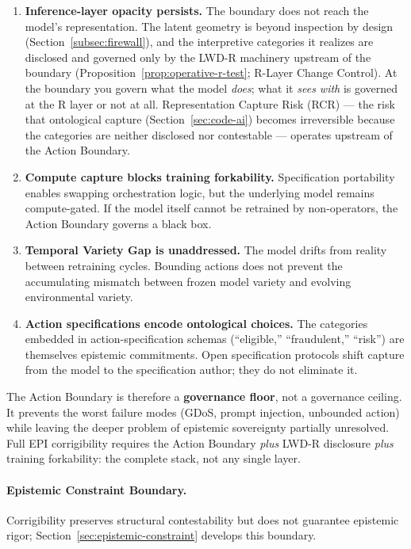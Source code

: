 \documentclass{article}
\theoremstyle{definition}
\begin{document}
\begin{enumerate}[noitemsep]
    \item \textbf{Inference-layer opacity persists.} The boundary does not reach the model's representation. The latent geometry is beyond inspection by design (Section~\ref{subsec:firewall}), and the interpretive categories it realizes are disclosed and governed only by the LWD-R machinery upstream of the boundary (Proposition~\ref{prop:operative-r-test}; R-Layer Change Control). At the boundary you govern what the model \textit{does}; what it \textit{sees with} is governed at the R layer or not at all. Representation Capture Risk (RCR) --- the risk that ontological capture (Section~\ref{sec:code-ai}) becomes irreversible because the categories are neither disclosed nor contestable --- operates upstream of the Action Boundary.

    \item \textbf{Compute capture blocks training forkability.} Specification portability enables swapping orchestration logic, but the underlying model remains compute-gated. If the model itself cannot be retrained by non-operators, the Action Boundary governs a black box.

    \item \textbf{Temporal Variety Gap is unaddressed.} The model drifts from reality between retraining cycles. Bounding actions does not prevent the accumulating mismatch between frozen model variety and evolving environmental variety.

    \item \textbf{Action specifications encode ontological choices.} The categories embedded in action-specification schemas (``eligible,'' ``fraudulent,'' ``risk'') are themselves epistemic commitments. Open specification protocols shift capture from the model to the specification author; they do not eliminate it.
\end{enumerate}

The Action Boundary is therefore a \textbf{governance floor}, not a governance ceiling. It prevents the worst failure modes (GDoS, prompt injection, unbounded action) while leaving the deeper problem of epistemic sovereignty partially unresolved. Full EPI corrigibility requires the Action Boundary \textit{plus} LWD-R disclosure \textit{plus} training forkability: the complete stack, not any single layer.

\paragraph{Epistemic Constraint Boundary.} Corrigibility preserves structural contestability but does not guarantee epistemic rigor; Section~\ref{sec:epistemic-constraint} develops this boundary.
\end{document}

